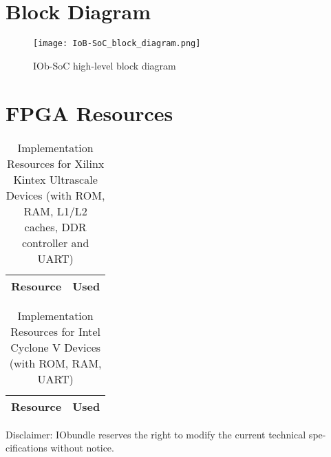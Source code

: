 \documentclass[twocolumn]{iob_pb}
\begin{document}
\section*{\textcolor[rgb]{0,0,0}{Block Diagram}}

\begin{figure}[H]
  \begin{center}
    \texttt{[image: IoB-SoC\_block\_diagram.png]}
    \caption{IOb-SoC high-level block diagram}
    \label{fig:IOb-SoC}
  \end{center}
\end{figure}




\section*{FPGA Resources}

\ifnum{}
\begin{table}[H]
  \begin{center}
    \begin{tabular}{|l|r|}
      \hline
%      
      \rowcolor{iob-green}
      \textbf{Resource}  & \textbf{Used} \\
      \hline
      \hline

       

    \end{tabular}
    \caption{Implementation Resources for Xilinx Kintex Ultrascale Devices (with ROM, RAM, L1/L2 caches, DDR controller and UART)}
    \label{tab:res-xil}
  \end{center}
\end{table}
\fi


\ifnum{}
\begin{table}[H]
  \begin{center}
    \begin{tabular}{|l|r|}
      \hline

      \rowcolor{iob-green}
      \textbf{Resource}  & \textbf{Used} \\
      \hline
      \hline

       
        
    \end{tabular}
    \caption{Implementation Resources for Intel Cyclone V Devices (with ROM, RAM, UART)}
    \label{tab:res-alt}
  \end{center}
\end{table}
\fi

\vspace*{0.5cm}
\noindent
\begin{scriptsize}
Disclaimer: IObundle reserves the right to modify the current
technical spe-cifications without notice.
\end{scriptsize}
\newpage
\end{document}
